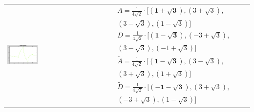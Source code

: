 \begin{tabular}{l||m{}|m{}|m{}}
	\includegraphics[width=0.3\textwidth]{content/Db2Psi.png} & 
	\begin{align}
		A = \frac{1}{4\sqrt{2}} \cdot [\mathbf{(1+\sqrt{3})}, (3+\sqrt{3}),  \nonumber\\
		(3-\sqrt{3}), (1-\sqrt{3})] \nonumber\\
		D = \frac{1}{4\sqrt{2}} \cdot [\mathbf{(1-\sqrt{3})}, (-3+\sqrt{3}),  \nonumber\\
		(3-\sqrt{3}), (-1+\sqrt{3})] \nonumber\\
		\tilde{A} = \frac{1}{4\sqrt{2}} \cdot [\mathbf{(1-\sqrt{3})}, (3-\sqrt{3}),  \nonumber\\
		(3+\sqrt{3}), (1+\sqrt{3})] \nonumber\\
		\tilde{D} = \frac{1}{4\sqrt{2}} \cdot [\mathbf{(-1-\sqrt{3})}, (3+\sqrt{3}),  \nonumber\\
		(-3+\sqrt{3}), (1-\sqrt{3})] \nonumber
	\end{align} \\
\end{tabular}
\renewcommand{\arraystretch}{1}

